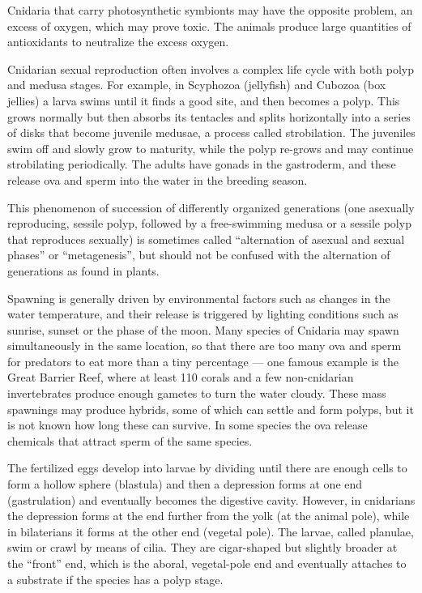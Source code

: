 Cnidaria that carry photosynthetic symbionts may have the opposite problem, an excess of oxygen, which may prove toxic. The animals produce large quantities of antioxidants to neutralize the excess oxygen.

Cnidarian sexual reproduction often involves a complex life cycle with both polyp and medusa stages. For example, in Scyphozoa (jellyfish) and Cubozoa (box jellies) a larva swims until it finds a good site, and then becomes a polyp. This grows normally but then absorbs its tentacles and splits horizontally into a series of disks that become juvenile medusae, a process called strobilation. The juveniles swim off and slowly grow to maturity, while the polyp re-grows and may continue strobilating periodically. The adults have gonads in the gastroderm, and these release ova and sperm into the water in the breeding season.

This phenomenon of succession of differently organized generations (one asexually reproducing, sessile polyp, followed by a free-swimming medusa or a sessile polyp that reproduces sexually) is sometimes called ``alternation of asexual and sexual phases'' or ``metagenesis'', but should not be confused with the alternation of generations as found in plants.

Spawning is generally driven by environmental factors such as changes in the water temperature, and their release is triggered by lighting conditions such as sunrise, sunset or the phase of the moon. Many species of Cnidaria may spawn simultaneously in the same location, so that there are too many ova and sperm for predators to eat more than a tiny percentage --- one famous example is the Great Barrier Reef, where at least 110 corals and a few non-cnidarian invertebrates produce enough gametes to turn the water cloudy. These mass spawnings may produce hybrids, some of which can settle and form polyps, but it is not known how long these can survive. In some species the ova release chemicals that attract sperm of the same species.

The fertilized eggs develop into larvae by dividing until there are enough cells to form a hollow sphere (blastula) and then a depression forms at one end (gastrulation) and eventually becomes the digestive cavity. However, in cnidarians the depression forms at the end further from the yolk (at the animal pole), while in bilaterians it forms at the other end (vegetal pole). The larvae, called planulae, swim or crawl by means of cilia. They are cigar-shaped but slightly broader at the ``front'' end, which is the aboral, vegetal-pole end and eventually attaches to a substrate if the species has a polyp stage.

